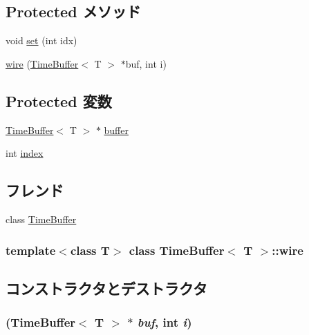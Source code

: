 \subsection*{Protected メソッド}
\begin{DoxyCompactItemize}
\item 
void \hyperlink{classTimeBuffer_1_1wire_afe5f3285602c2361c6b8362f44328d19}{set} (int idx)
\item 
\hyperlink{classTimeBuffer_1_1wire_a043a64377587cda5ac5be7dc24ecf9bc}{wire} (\hyperlink{classTimeBuffer}{TimeBuffer}$<$ T $>$ $\ast$buf, int i)
\end{DoxyCompactItemize}
\subsection*{Protected 変数}
\begin{DoxyCompactItemize}
\item 
\hyperlink{classTimeBuffer}{TimeBuffer}$<$ T $>$ $\ast$ \hyperlink{classTimeBuffer_1_1wire_ad36b7f8216dc8ccf9d9820d3f763d563}{buffer}
\item 
int \hyperlink{classTimeBuffer_1_1wire_a750b5d744c39a06bfb13e6eb010e35d0}{index}
\end{DoxyCompactItemize}
\subsection*{フレンド}
\begin{DoxyCompactItemize}
\item 
class \hyperlink{classTimeBuffer_1_1wire_ab310b460b3d600c3c1251fb672966fe6}{TimeBuffer}
\end{DoxyCompactItemize}
\subsubsection*{template$<$class T$>$ class TimeBuffer$<$ T $>$::wire}



\subsection{コンストラクタとデストラクタ}
\hypertarget{classTimeBuffer_1_1wire_a043a64377587cda5ac5be7dc24ecf9bc}{
\subsubsection[{wire}]{ ({\bf TimeBuffer}$<$ T $>$ $\ast$ {\em buf}, \/  int {\em i})}}
\label{classTimeBuffer_1_1wire_a043a64377587cda5ac5be7dc24ecf9bc}



